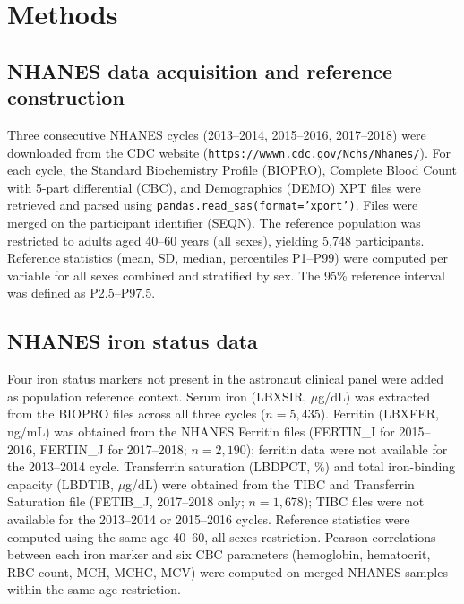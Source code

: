 \documentclass[11pt,a4paper]{article}
\begin{document}
\section{Methods}

\subsection{NHANES data acquisition and reference construction}

Three consecutive NHANES cycles (2013--2014, 2015--2016, 2017--2018) were downloaded from the CDC website (\texttt{https://wwwn.cdc.gov/Nchs/Nhanes/}). For each cycle, the Standard Biochemistry Profile (BIOPRO), Complete Blood Count with 5-part differential (CBC), and Demographics (DEMO) XPT files were retrieved and parsed using \texttt{pandas.read\_sas(format='xport')}. Files were merged on the participant identifier (SEQN). The reference population was restricted to adults aged 40--60 years (all sexes), yielding 5,748 participants. Reference statistics (mean, SD, median, percentiles P1--P99) were computed per variable for all sexes combined and stratified by sex. The 95\% reference interval was defined as P2.5--P97.5.

\subsection{NHANES iron status data}

Four iron status markers not present in the astronaut clinical panel were added as population reference context. Serum iron (LBXSIR, $\mu$g/dL) was extracted from the BIOPRO files across all three cycles ($n = 5{,}435$). Ferritin (LBXFER, ng/mL) was obtained from the NHANES Ferritin files (FERTIN\_I for 2015--2016, FERTIN\_J for 2017--2018; $n = 2{,}190$); ferritin data were not available for the 2013--2014 cycle. Transferrin saturation (LBDPCT, \%) and total iron-binding capacity (LBDTIB, $\mu$g/dL) were obtained from the TIBC and Transferrin Saturation file (FETIB\_J, 2017--2018 only; $n = 1{,}678$); TIBC files were not available for the 2013--2014 or 2015--2016 cycles. Reference statistics were computed using the same age 40--60, all-sexes restriction. Pearson correlations between each iron marker and six CBC parameters (hemoglobin, hematocrit, RBC count, MCH, MCHC, MCV) were computed on merged NHANES samples within the same age restriction.
\end{document}
